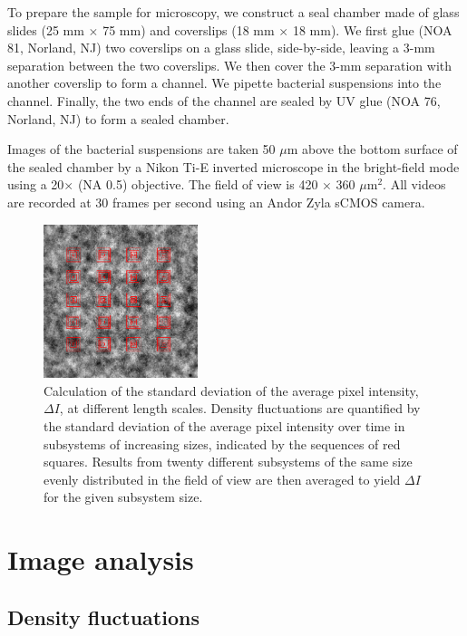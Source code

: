 \documentclass[twocolumn,aps,prx,amsmath,amssymb,longbibliography,superscriptaddress]{revtex4-2}
\begin{document}
To prepare the sample for microscopy, we construct a seal chamber made of glass slides (25 mm $\times$ 75 mm) and coverslips (18 mm $\times$ 18 mm). We first glue (NOA 81, Norland, NJ) two coverslips on a glass slide, side-by-side, leaving a 3-mm separation between the two coverslips. We then cover the 3-mm separation with another coverslip to form a channel. We pipette bacterial suspensions into the channel. Finally, the two ends of the channel are sealed by UV glue (NOA 76, Norland, NJ) to form a sealed chamber.

Images of the bacterial suspensions are taken 50 $\mu$m above the bottom surface of the sealed chamber by a Nikon Ti-E inverted microscope in the bright-field mode using a 20$\times$ (NA 0.5) objective. The field of view is 420 $\times$ 360 $\mu$m$^2$. All videos are recorded at 30 frames per second using an Andor Zyla sCMOS camera.

\begin{figure}[t]
	\begin{center}
		\includegraphics[width=0.4\textwidth]{Figures/fig-7.pdf}
		\caption[GNF calculations]
		{Calculation of the standard deviation of the average pixel intensity, $\Delta I$, at different length scales. Density fluctuations are quantified by the standard deviation of the average pixel intensity over time in subsystems of increasing sizes, indicated by the sequences of red squares. Results from twenty different subsystems of the same size evenly distributed in the field of view are then averaged to yield $\Delta I$ for the given subsystem size.}
		\label{GNF-calculation}
	\end{center}
\end{figure}


\section{Image analysis} \label{appendix-IA}
\subsection{Density fluctuations} \label{sec:GNF-calculations}
\end{document}
